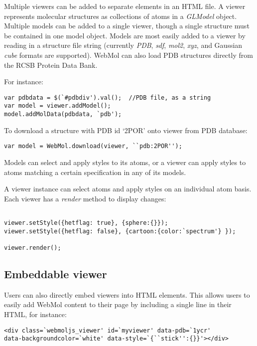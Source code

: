 \documentclass[]{bioinfo}
\begin{document}
Multiple viewers can be added to separate elements in an HTML file.  A viewer represents molecular structures as collections of atoms in a \emph{GLModel} object.  Multiple models can be added to a single viewer, though a single structure must be contained in one model object.  Models are most easily added to a viewer by reading in a structure file string (currently \emph{PDB}, \emph{sdf}, \emph{mol2}, \emph{xyz}, and Gaussian \emph{cube} formats are supported).  WebMol can also load PDB structures directly from the RCSB Protein Data Bank.

For instance:

\begin{verbatim}
var pdbdata = $(`#pdbdiv').val();  //PDB file, as a string
var model = viewer.addModel();
model.addMolData(pdbdata, `pdb');
\end{verbatim}

To download a structure with PDB id `2POR' onto viewer from PDB database:

\begin{verbatim}
var model = WebMol.download(viewer, ``pdb:2POR'');
\end{verbatim}

Models can select and apply styles to its atoms, or a viewer can apply styles to atoms matching a certain specification in any of its models.

A viewer instance can select atoms and apply styles on an individual atom basis.  Each viewer has a \emph{render} method to display changes:

\begin{verbatim}

viewer.setStyle({hetflag: true}, {sphere:{}});
viewer.setStyle({hetflag: false}, {cartoon:{color:`spectrum'} });

viewer.render();
\end{verbatim}

\subsection{Embeddable viewer}
Users can also directly embed viewers into HTML elements. This allows users to easily add WebMol content to their page by including a single line in their HTML, for instance:

\begin{verbatim}
<div class=`webmoljs_viewer' id=`myviewer' data-pdb=`1ycr' 
data-backgroundcolor=`white' data-style=`{``stick'':{}}'></div>
\end{verbatim}
\end{document}
